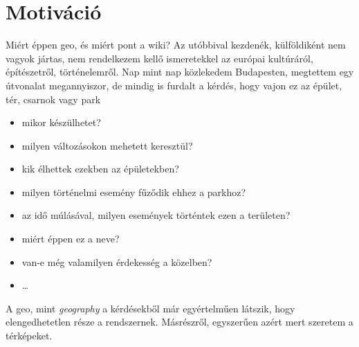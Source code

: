 \makeatletter
\def\thickhrulefill{\leavevmode \leaders \hrule height 1ex \hfill \kern \z@}
\def\@makechapterhead#1{%
  \vspace*{10\p@}%
  {\parindent \z@ \centering \reset@font
        {\Huge \scshape \thechapter}
        \par\nobreak
        \vspace*{15\p@}%
        \interlinepenalty\@M
        \begin{tabular}{@{\qquad}c@{\qquad}}
          \hline
          \\
          {\Huge \bfseries #1\par\nobreak} \\
          \\
          \hline
        \end{tabular}
    \vskip 100\p@
  }}
\def\@makeschapterhead#1{%
  \vspace*{10\p@}%
  {\parindent \z@ \centering \reset@font
        {\Huge \scshape \vphantom{\thechapter}}
        \par\nobreak
        \vspace*{15\p@}%
        \interlinepenalty\@M
        \begin{tabular}{@{\qquad}c@{\qquad}}
          \hline
          \\
          {\Huge \bfseries #1\par\nobreak} \\
          \\
          \hline
        \end{tabular}
    \vskip 100\p@
  }}

\chapter{Motiváció}
  Miért éppen geo, és miért pont a wiki? Az utóbbival kezdenék, külföldiként nem vagyok jártas, 
  nem rendelkezem kellő ismeretekkel az európai kultúráról, építészetről, történelemről. Nap mint nap közlekedem Budapesten, 
  megtettem egy útvonalat megannyiszor, de mindig is furdalt a kérdés, hogy vajon ez az épület, tér, csarnok vagy park
	\begin{itemize}
		\item mikor készülhetet?
		\item milyen változásokon mehetett keresztül?
		\item kik élhettek ezekben az épületekben?
		\item milyen történelmi esemény fűződik ehhez a parkhoz?
		\item az idő múlásával, milyen események történtek ezen a területen?
		\item miért éppen ez a neve?
		\item van-e még valamilyen érdekesség a közelben?
		\item \ldots
	\end{itemize}
	A geo, mint \emph{geography} a kérdésekből már egyértelműen látszik, hogy elengedhetetlen része a rendszernek. Másrészről, egyszerűen azért mert szeretem a térképeket.
	
